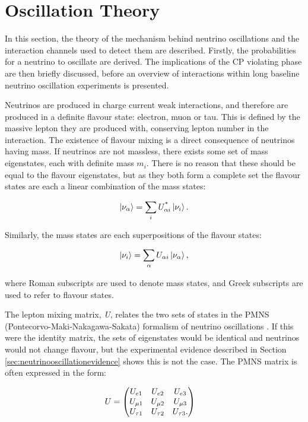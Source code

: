 \section{Oscillation Theory}\label{sec:oscillationtheory}

In this section, the theory of the mechanism behind neutrino oscillations and the interaction channels used to detect them are described. Firstly, the probabilities for a neutrino to oscillate are derived. The implications of the CP violating phase are then briefly discussed, before an overview of interactions within long baseline neutrino oscillation experiments is presented.

Neutrinos are produced in charge current weak interactions, and therefore are produced in a definite flavour state: electron, muon or tau. This is defined by the massive lepton they are produced with, conserving lepton number in the interaction. The existence of flavour mixing is a direct consequence of neutrinos having mass. If neutrinos are not massless, there exists some set of mass eigenstates, each with definite mass $m_i$. There is no reason that these should be equal to the flavour eigenstates, but as they both form a complete set the flavour states are each a linear combination of the mass states:

\begin{equation}
\ket{\nu_{\alpha}} = \sum_{i} U^{\text{*}}_{\alpha i} \ket{\nu_{i}}.
\end{equation}

Similarly, the mass states are each superpositions of the flavour states: 

\begin{equation}
\ket{\nu_{i}} = \sum_{\alpha} U_{\alpha i} \ket{\nu_{\alpha}},
\label{eqn:lincomb}
\end{equation}

where Roman subscripts are used to denote mass states, and Greek subscripts are used to refer to flavour states.

The lepton mixing matrix, \textit{U}, relates the two sets of states in the PMNS (Pontecorvo-Maki-Nakagawa-Sakata) formalism of neutrino oscillations \cite{pmns}. If this were the identity matrix, the sets of eigenstates would be identical and neutrinos would not change flavour, but the experimental evidence described in Section \ref{sec:neutrinooscillationevidence} shows this is not the case. The PMNS matrix is often expressed in the form:

\begin{equation}
\begin{aligned}
U & =
\begin{pmatrix}
U_{e1} & U_{e2} & U_{e 3}\\
U_{\mu 1} & U_{\mu 2} & U_{\mu 3} \\
U_{\tau 1} & U_{\tau 2} & U_{\tau 3}.
\end{pmatrix}
\end{aligned}
\vspace{8pt}
\end{equation}

